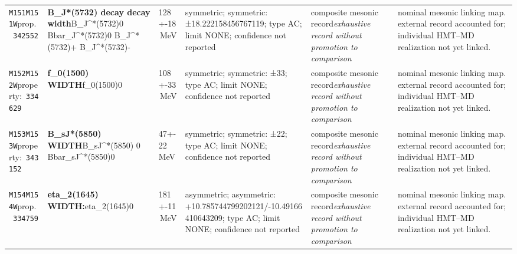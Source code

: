 \begin{landscape}
\begin{longtable}{L{1.85cm}L{4.45cm}L{2.35cm}L{4.05cm}L{3.35cm}L{7.15cm}}
\texttt{M151}\newline \texttt{M151W}\newline prop.\ \texttt{342552} & \textbf{B\_\allowbreak{}J*(5732) decay decay width}\newline B\_\allowbreak{}J\textasciicircum{}*(5732)0 \textbar{}\allowbreak{} Bbar\_\allowbreak{}J\textasciicircum{}*(5732)0 \textbar{}\allowbreak{} B\_\allowbreak{}J\textasciicircum{}*(5732)+ \textbar{}\allowbreak{} B\_\allowbreak{}J\textasciicircum{}*(5732)- & 128+-18\,MeV & symmetric; symmetric: ±18.222158456767119; type AC; limit NONE; confidence not reported & composite mesonic record\newline \emph{exhaustive record without promotion to comparison} & nominal mesonic linking map. external record accounted for; individual HMT--MD realization not yet linked. \\
\texttt{M152}\newline \texttt{M152W}\newline property:\ \texttt{334629} & \textbf{f\_\allowbreak{}0(1500) WIDTH}\newline f\_\allowbreak{}0(1500)0 & 108+-33\,MeV & symmetric; symmetric: ±33; type AC; limit NONE; confidence not reported & composite mesonic record\newline \emph{exhaustive record without promotion to comparison} & nominal mesonic linking map. external record accounted for; individual HMT--MD realization not yet linked. \\
\texttt{M153}\newline \texttt{M153W}\newline property:\ \texttt{343152} & \textbf{B\_\allowbreak{}sJ*(5850) WIDTH}\newline B\_\allowbreak{}sJ\textasciicircum{}*(5850) 0 \textbar{}\allowbreak{} Bbar\_\allowbreak{}sJ\textasciicircum{}*(5850)0 & 47+-22\,MeV & symmetric; symmetric: ±22; type AC; limit NONE; confidence not reported & composite mesonic record\newline \emph{exhaustive record without promotion to comparison} & nominal mesonic linking map. external record accounted for; individual HMT--MD realization not yet linked. \\
\texttt{M154}\newline \texttt{M154W}\newline prop.\ \texttt{334759} & \textbf{eta\_\allowbreak{}2(1645) WIDTH:}\newline eta\_\allowbreak{}2(1645)0 & 181+-11\,MeV & asymmetric; asymmetric: +10.785744799202121/-10.49166410643209; type AC; limit NONE; confidence not reported & composite mesonic record\newline \emph{exhaustive record without promotion to comparison} & nominal mesonic linking map. external record accounted for; individual HMT--MD realization not yet linked. \\

\end{longtable}
\end{landscape}
